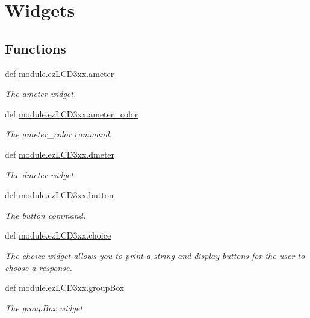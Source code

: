 \hypertarget{group___widgets}{\section{Widgets}
\label{df/d3e/group___widgets}
}
\subsection*{Functions}
\begin{DoxyCompactItemize}
\item 
def \hyperlink{group___widgets_ga437287c80e84027b6b9bebfe31764202}{module.\-ez\-L\-C\-D3xx.\-ameter}
\begin{DoxyCompactList}\small\item\em The ameter widget. \end{DoxyCompactList}\item 
def \hyperlink{group___widgets_gabe969d0e420d69f79a659f115e810acd}{module.\-ez\-L\-C\-D3xx.\-ameter\-\_\-color}
\begin{DoxyCompactList}\small\item\em The ameter\-\_\-color command. \end{DoxyCompactList}\item 
def \hyperlink{group___widgets_gae047f70bd7485eafe1e352282cf3c999}{module.\-ez\-L\-C\-D3xx.\-dmeter}
\begin{DoxyCompactList}\small\item\em The dmeter widget. \end{DoxyCompactList}\item 
def \hyperlink{group___widgets_ga6ce046794cbbfa9236c745b712fd2d6d}{module.\-ez\-L\-C\-D3xx.\-button}
\begin{DoxyCompactList}\small\item\em The button command. \end{DoxyCompactList}\item 
def \hyperlink{group___widgets_gaae5f45e0ca7c8a0294c75b786d728992}{module.\-ez\-L\-C\-D3xx.\-choice}
\begin{DoxyCompactList}\small\item\em The choice widget allows you to print a string and display buttons for the user to choose a response. \end{DoxyCompactList}\item 
def \hyperlink{group___widgets_ga189db08deeaf2ff69fad7e7e3612fe5b}{module.\-ez\-L\-C\-D3xx.\-group\-Box}
\begin{DoxyCompactList}\small\item\em The group\-Box widget. \end{DoxyCompactList}\item 

\end{DoxyCompactItemize}

